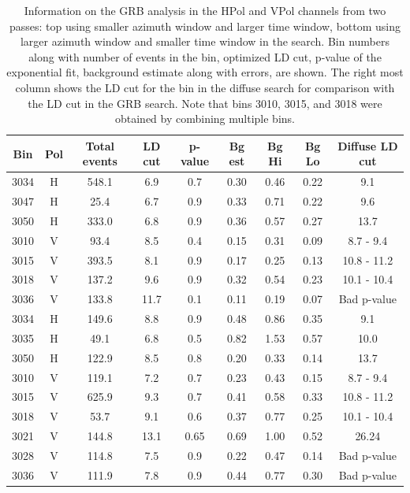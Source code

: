 \begin{table}
\centering
\begin{tabular}{ |c|c|c|c|c|c|c|c|c| } 
\hline
Bin & Pol & Total events & LD cut & p-value & Bg est & Bg Hi & Bg Lo & Diffuse LD cut\\
\hline
3034 & H & 548.1 & 6.9 & 0.7 & 0.30 & 0.46 & 0.22 & 9.1\\
3047 & H & 25.4 &	6.7	& 0.9 & 0.33 & 0.71 & 0.22 & 9.6\\
3050 & H & 333.0 & 6.8 & 0.9 & 0.36	& 0.57 & 0.27 & 13.7\\
\hline
\hline
\hline
3010 & V &	93.4  &	8.5 & 0.4 & 0.15 &	0.31 &	0.09 & 8.7 - 9.4\\
3015 & V &	393.5 &	8.1	& 0.9 & 0.17 &	0.25 &	0.13 & 10.8 - 11.2\\
3018 & V &	137.2 &	9.6 & 0.9 & 0.32 &	0.54 &	0.23 & 10.1 - 10.4\\
\hline
3036 & V &	133.8 &	11.7 &	0.1 &   0.11 &	0.19 &	0.07 & Bad p-value\\
\hline
\hline
\hline 
\hline
\hline
3034 & H & 149.6 & 8.8 & 0.9 & 0.48	& 0.86 & 0.35 & 9.1\\
3035 & H & 49.1 & 6.8 & 0.5 & 0.82 & 1.53 & 0.57 & 10.0\\
3050 & H & 122.9 & 8.5 & 0.8 & 0.20	& 0.33 & 0.14 & 13.7\\
\hline
\hline
\hline
3010 & V & 119.1 & 7.2 & 0.7 & 0.23	& 0.43 & 0.15 & 8.7 - 9.4\\
3015 & V & 625.9 & 9.3 & 0.7 & 0.41 & 0.58 & 0.33 & 10.8 - 11.2\\
3018 & V & 53.7	& 9.1 & 0.6	& 0.37	& 0.77 & 0.25 & 10.1 - 10.4\\
\hline
3021 & V & 144.8 & 13.1	& 0.65 & 0.69 & 1.00 & 0.52 & 26.24\\
3028 & V & 114.8 & 7.5 & 0.9 & 0.22	& 0.47 & 0.14 & Bad p-value\\
3036 & V & 111.9 & 7.8 & 0.9 & 0.44	& 0.77 & 0.30 & Bad p-value\\
\hline
\end{tabular}
\caption{Information on the GRB analysis in the HPol and VPol channels from two passes: top using smaller azimuth window and larger time window, bottom using larger azimuth window and smaller time window in the search. Bin numbers along with number of events in the bin, optimized LD cut, p-value of the exponential fit, background estimate along with errors, are shown. The right most column shows the LD cut for the bin in the diffuse search for comparison with the LD cut in the GRB search. Note that bins 3010, 3015, and 3018 were obtained by combining multiple bins.}
\label{hpol_table}
\end{table}


